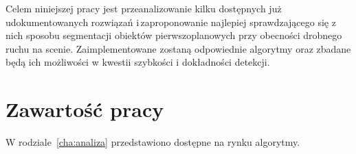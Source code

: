 Celem niniejszej pracy jest przeanalizowanie kilku dostępnych już udokumentowanych rozwiązań i\,zaproponowanie najlepiej sprawdzającego się z nich sposobu segmentacji obiektów pierwszoplanowych przy obecności drobnego ruchu na scenie. Zaimplementowane zostaną odpowiednie algorytmy oraz zbadane będą ich możliwości w kwestii szybkości i dokładności detekcji. 



\section{Zawartość pracy}
\label{sec:zawartoscPracy}

W rodziale~\ref{cha:analiza} przedstawiono dostępne na rynku algorytmy. 



















